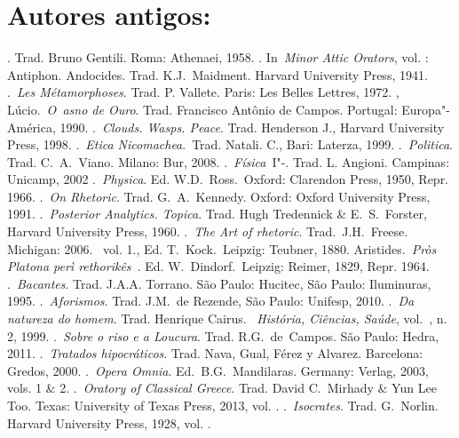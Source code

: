  

\section{Autores antigos:}

 

\begin{bibliohedra}
. Trad. Bruno Gentili. Roma: Athenaei, 1958.
. In~\emph{Minor Attic Orators}, vol. : Antiphon.
  Andocides. Trad. K.J.~Maidment. Harvard University Press, 1941.
.~\emph{Les Métamorphoses}. Trad. P. Vallete. Paris: Les Belles
  Lettres, 1972.
, Lúcio.~\emph{O~asno de Ouro}. Trad. Francisco Antônio de
  Campos. Portugal: Europa"-América, 1990.
.~\emph{Clouds. Wasps. Peace}. Trad. Henderson J., Harvard
  University Press, 1998.
.~\emph{Etica Nicomachea}.~Trad. Natali. C., Bari: Laterza,
  1999.
.~\emph{Politica}. Trad. C.~A.~Viano. Milano: Bur, 2008.
.~\emph{Física}~I"-. Trad. L. Angioni. Campinas: Unicamp,
  2002
.~\emph{Physica}. Ed. W.D.~Ross.~Oxford: Clarendon Press,
  1950, Repr. 1966.
.~\emph{On Rhetoric}. Trad. G.~A.~Kennedy. Oxford: Oxford
  University Press, 1991.
.~\emph{Posterior Analytics. Topica}. Trad. Hugh Tredennick
  \& E.~S.~Forster, Harvard University Press, 1960.
.~\emph{The Art of rhetoric}. Trad.~J.H.~Freese. Michigan:
  2006.
~vol. 1., Ed. T.~Kock.~Leipzig: Teubner, 1880.
 Aristides.~\emph{Pròs Platona perì rethorikês~}. Ed. W.~Dindorf.~Leipzig: Reimer, 1829, Repr. 1964.
.~\emph{Bacantes}. Trad. J.A.A. Torrano. São Paulo: Hucitec,
  São Paulo: Iluminuras, 1995.
.~\emph{Aforismos}. Trad. J.M.~de Rezende, São Paulo:
  Unifesp, 2010.
.~\emph{Da natureza do homem}. Trad. Henrique Cairus.
  ~\emph{História, Ciências, Saúde}, vol.~, n. 2, 1999.
.~\emph{Sobre o riso e a Loucura}. Trad. R.G.~de~Campos.
  São Paulo: Hedra, 2011.
.~\emph{Tratados hipocráticos}. Trad. Nava, Gual, Férez y
  Alvarez. Barcelona: Gredos, 2000.
.~\emph{Opera Omnia}. Ed.~B.G.~Mandilaras. Germany:
  Verlag, 2003, vols. 1 \& 2.
.~\emph{Oratory of Classical Greece}. Trad. David C.~Mirhady \&
  Yun Lee Too. Texas: University of Texas Press, 2013, vol. .
.~\emph{Isocrates}. Trad. G.~Norlin. Harvard University Press, 1928, vol. .

\end{bibliohedra}
